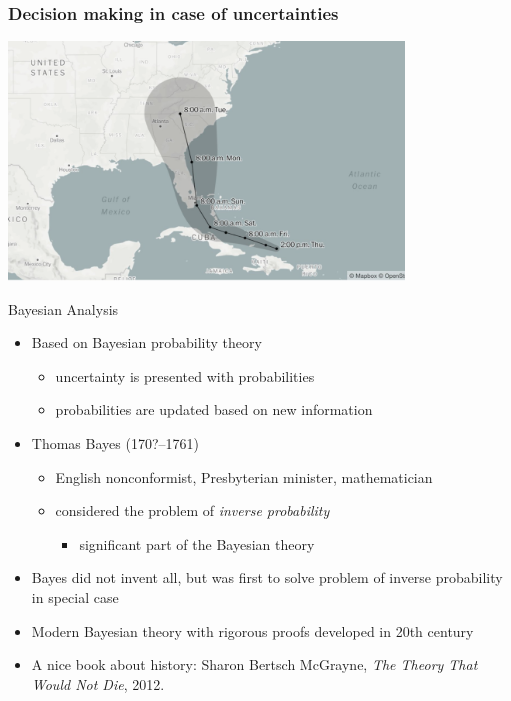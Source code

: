 \documentclass[english,t]{beamer}
\date{}
\begin{document}
\begin{frame}
  
  \frametitle{Decision making in case of uncertainties}

  \begin{center}
    \includegraphics[width=10.5cm]{irma.png}
  \end{center}
\end{frame}

\begin{frame}{Bayesian Analysis}

  \begin{itemize}
  \item Based on Bayesian probability theory
    \begin{itemize}
    \item uncertainty is presented with probabilities
    \item probabilities are updated based on new information
    \end{itemize}
    \pause
    \item Thomas Bayes (170?--1761)
    \begin{itemize}
    \item English nonconformist, Presbyterian minister,
      mathematician
    \item considered the problem of {\it inverse probability}
      \begin{itemize}
        \item significant part of the Bayesian theory
      \end{itemize}
  \end{itemize}
  \pause
  \item Bayes did not invent all, but was first to solve problem of
    inverse probability in special case
  \item Modern Bayesian theory with rigorous proofs developed in
    20th century
    \pause
  \item A nice book about history: Sharon Bertsch McGrayne,
    \textit{The Theory That Would Not Die}, 2012.
\end{itemize}
\end{frame}
\end{document}
